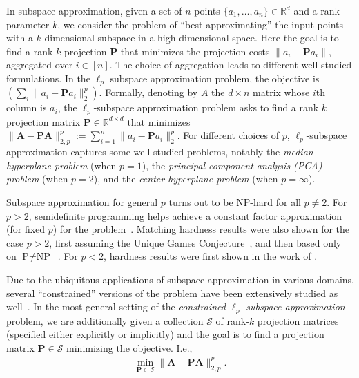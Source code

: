 \documentclass[11pt]{article}
\theoremstyle{plain}
\theoremstyle{plain}
\theoremstyle{definition}
\theoremstyle{plain}
\theoremstyle{remark}
\newcommand{\RR}{\mathbb{R}}
\begin{document}
In subspace approximation, given a set of $n$ points $\{a_1,\ldots, a_n\} \in \mathbb{R}^d$ and a rank parameter $k$, we consider the problem of ``best approximating'' the input points with a $k$-dimensional subspace in a high-dimensional space. Here the goal is to find a rank $k$ projection $\bm{P}$ that minimizes the projection costs $\| a_i - \bm{P} a_i\|$, aggregated over $i\in [n]$. The choice of aggregation leads to different well-studied formulations. In the $\ell_p$ subspace approximation problem, the objective is $\left( \sum_i \| a_i - \bm{P} a_i \|_2^p \right)$. Formally, denoting by $A$ the $d\times n$ matrix whose $i$th column is $a_i$, the $\ell_p$-subspace approximation problem asks to find a rank $k$ projection matrix $\bm{P} \in \RR^{d\times d}$ that minimizes $\| \bm{A} - \bm{P} \bm{A} \|_{2,p}^p := \sum_{i=1}^n \|a_i-\bm{P}a_i\|_2^p$. For different choices of $p$, $\ell_p$-subspace approximation captures some well-studied problems, notably the {\em median hyperplane problem} (when $p=1$), the {\em principal component analysis (PCA) problem} (when $p=2$), and the {\em center hyperplane problem} (when $p=\infty$).  

Subspace approximation for general $p$ turns out to be NP-hard for all $p \ne 2$. For $p>2$, semidefinite programming helps achieve a constant factor approximation (for fixed $p$) for the problem~\cite{deshpande2011alg}. Matching hardness results were also shown for the case $p>2$, first assuming the Unique Games Conjecture~\cite{deshpande2011alg}, and then based only on $\text{P} \ne \text{NP}$~\cite{guruswami2016bypass}. For $p<2$, hardness results were first shown in the work of \cite{clarkson2015input}. 

Due to the ubiquitous applications of subspace approximation in various domains, several ``constrained'' versions of the problem have been extensively studied as well~\cite{drineas2004clustering,yuan2013truncated,papailiopoulos2013sparse,asteris2014nonnegative,boutsidis2014randomized,cohen2015dimensionality}. In the most general setting of the {\em constrained $\ell_p$-subspace approximation} problem, we are additionally given a collection $\mathcal{S}$ of rank-$k$ projection matrices (specified either explicitly or implicitly) and the goal is to find a projection matrix $\bm{P} \in \mathcal{S}$ minimizing the objective. I.e.,
\begin{align}\label{eq:csa}
    \min_{\bm{P} \in \mathcal{S}} \|\bm{A} - \bm{P}\bm{A}\|_{2,p}^p.
\end{align}
\end{document}
